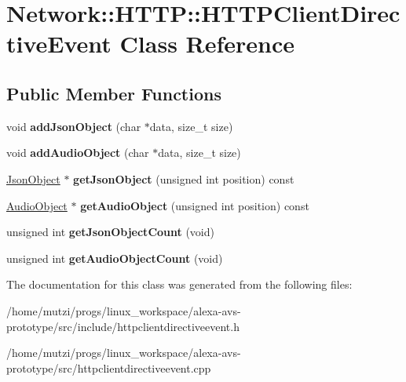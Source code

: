 \hypertarget{classNetwork_1_1HTTP_1_1HTTPClientDirectiveEvent}{}\section{Network\+:\+:H\+T\+TP\+:\+:H\+T\+T\+P\+Client\+Directive\+Event Class Reference}
\label{classNetwork_1_1HTTP_1_1HTTPClientDirectiveEvent}
\subsection*{Public Member Functions}
\begin{DoxyCompactItemize}
\item 
\mbox{\label{classNetwork_1_1HTTP_1_1HTTPClientDirectiveEvent_acbc914fb3b9706b26ac3609fca49ab60}} 
void {\bfseries add\+Json\+Object} (char $\ast$data, size\+\_\+t size)
\item 
\mbox{\label{classNetwork_1_1HTTP_1_1HTTPClientDirectiveEvent_a8f02fb695e3c9b2ebbf66d07d75e292c}} 
void {\bfseries add\+Audio\+Object} (char $\ast$data, size\+\_\+t size)
\item 
\mbox{\label{classNetwork_1_1HTTP_1_1HTTPClientDirectiveEvent_a4bf514613a24ced321780eefff18d864}} 
\hyperlink{structNetwork_1_1HTTP_1_1JsonObject}{Json\+Object} $\ast$ {\bfseries get\+Json\+Object} (unsigned int position) const
\item 
\mbox{\label{classNetwork_1_1HTTP_1_1HTTPClientDirectiveEvent_a197a9dc3086a4a8a0df994cc7e32f880}} 
\hyperlink{structNetwork_1_1HTTP_1_1AudioObject}{Audio\+Object} $\ast$ {\bfseries get\+Audio\+Object} (unsigned int position) const
\item 
\mbox{\label{classNetwork_1_1HTTP_1_1HTTPClientDirectiveEvent_ae1290f307234c3b777d0f807ec20b2e9}} 
unsigned int {\bfseries get\+Json\+Object\+Count} (void)
\item 
\mbox{\label{classNetwork_1_1HTTP_1_1HTTPClientDirectiveEvent_a16bd2171956e5e7562d9c33b5c702bfd}} 
unsigned int {\bfseries get\+Audio\+Object\+Count} (void)
\end{DoxyCompactItemize}


The documentation for this class was generated from the following files\+:\begin{DoxyCompactItemize}
\item 
/home/mutzi/progs/linux\+\_\+workspace/alexa-\/avs-\/prototype/src/include/httpclientdirectiveevent.\+h\item 
/home/mutzi/progs/linux\+\_\+workspace/alexa-\/avs-\/prototype/src/httpclientdirectiveevent.\+cpp\end{DoxyCompactItemize}
